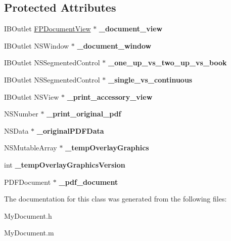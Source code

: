 \subsection*{Protected Attributes}
\begin{DoxyCompactItemize}
\item 
\mbox{\label{interface_my_document_a76cefefcfbe843bee77c880d9bcc5110}} 
I\+B\+Outlet \mbox{\hyperlink{interface_f_p_document_view}{F\+P\+Document\+View}} $\ast$ {\bfseries \+\_\+document\+\_\+view}
\item 
\mbox{\label{interface_my_document_a1b25b93c068f2c10c86ec7938372d51a}} 
I\+B\+Outlet N\+S\+Window $\ast$ {\bfseries \+\_\+document\+\_\+window}
\item 
\mbox{\label{interface_my_document_a1fba46d62bb6e8473d8fce60d8ec4c45}} 
I\+B\+Outlet N\+S\+Segmented\+Control $\ast$ {\bfseries \+\_\+one\+\_\+up\+\_\+vs\+\_\+two\+\_\+up\+\_\+vs\+\_\+book}
\item 
\mbox{\label{interface_my_document_a32a0504505ce351ae290c978306eac10}} 
I\+B\+Outlet N\+S\+Segmented\+Control $\ast$ {\bfseries \+\_\+single\+\_\+vs\+\_\+continuous}
\item 
\mbox{\label{interface_my_document_af54cc5a057dfa376eb5011c1b3b44e6d}} 
I\+B\+Outlet N\+S\+View $\ast$ {\bfseries \+\_\+print\+\_\+accessory\+\_\+view}
\item 
\mbox{\label{interface_my_document_aaa42953c716ce5d5a8217c2e3ff29ff0}} 
N\+S\+Number $\ast$ {\bfseries \+\_\+print\+\_\+original\+\_\+pdf}
\item 
\mbox{\label{interface_my_document_a3ac32c4d8c23334a41ffeb1bbb9345b8}} 
N\+S\+Data $\ast$ {\bfseries \+\_\+original\+P\+D\+F\+Data}
\item 
\mbox{\label{interface_my_document_a4e03c7d03120c3ca131c26412a2dc302}} 
N\+S\+Mutable\+Array $\ast$ {\bfseries \+\_\+temp\+Overlay\+Graphics}
\item 
\mbox{\label{interface_my_document_a4ed3058ce74dd87b127acd317fb7770c}} 
int {\bfseries \+\_\+temp\+Overlay\+Graphics\+Version}
\item 
\mbox{\label{interface_my_document_a84c596fd36773a9fa60a9935a64e82cc}} 
P\+D\+F\+Document $\ast$ {\bfseries \+\_\+pdf\+\_\+document}
\end{DoxyCompactItemize}


The documentation for this class was generated from the following files\+:\begin{DoxyCompactItemize}
\item 
My\+Document.\+h\item 
My\+Document.\+m\end{DoxyCompactItemize}
